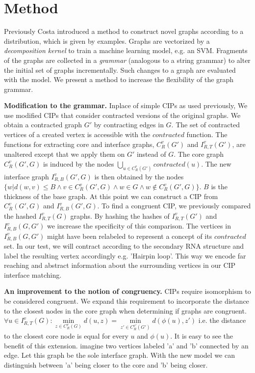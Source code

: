 \documentclass{article}
\begin{document}
\section{Method}
Previously Costa \cite{costa14} introduced a method
to construct novel graphs according to a distribution, which is given by
examples. Graphs are vectorized by a \emph{decomposition kernel}
to train a machine learning model, e.g. an SVM.
Fragments of the graphs are collected in 
a \emph{grammar} (analogous to a string grammar) to alter the initial
set of graphs incrementally. Such changes to a graph are evaluated with the
model. 
We present a method to increase the flexibility of the graph grammar.


\textbf{Modification to the grammar.}
Inplace of simple CIPs as used previously,
We use modified CIPs that consider contracted versions
of the original graphs. We obtain a contracted graph $G'$ by contracting edges
in $G$. The set of contracted vertices of a
created vertex is accessible with the $contracted$ function.
The functions for extracting core and interface graphs, 
$C_{R}^v(G')$ and $I_{R,T}^v(G')$, are unaltered except that we apply them
on $G'$ instead of $G$. 
The core graph $C_{R}^v(G',G)$ is induced by the nodes 
$\bigcup\limits_{u \in C_R^v(G')} contracted(u)$.
The new interface graph $I_{R,B}^v(G',G)$ is then obtained by the nodes 
$\{ w | d(w,v) \leq B \wedge v\in C_R^v(G',G) \wedge w \in G \wedge w 
\notin C_R^v(G',G) \}$.  $B$ is the thickness of the base graph. 
At this point we can construct a CIP from $C_R^v(G',G)$ and $I_{R,B}^v(G',G)$. 
To find a congruent CIP, we previously compared the hashed $I_{R,T}^v(G)$ 
graphs. By hashing the hashes of $I_{R,T}^v(G')$ and $I_{R,B}^v(G,G')$ we 
increase the specificity of this comparison. The vertices in $I_{R,B}^v(G,G')$ 
might have been relabeled to represent a concept of its $contracted$ set. In 
our test, we will contract according to the 
secondary RNA structure and label the resulting vertex accordingly e.g.
'Hairpin loop'. This way we encode far reaching and abstract 
information about the surrounding vertices in our CIP interface matching.



\textbf{An improvement to the notion of congruency.}
CIPs require isomorphism to be considered congruent.
We expand this requirement to incorporate
the distance to the closest nodes in the core graph when 
determining if graphs are congruent.
$\forall u \in I_{R,T}^v(G) : 
\underset{z \in  C_{R}^v(G)}{\min} d(u,z) = 
\underset{z' \in  C_{R}^{v'}(G')}{\min} d(\phi(u),z') $ i.e. the distance 
to the closest core node is equal for every
$u$ and $\phi(u)$.
It is easy to see the benefit of this extension.
imagine two vertices labeled 'a' and 'b' connected by an edge. Let this graph
be the sole interface graph. With the new model we can distinguish 
between 'a' being closer to the core and 'b' being closer. 
\end{document}
